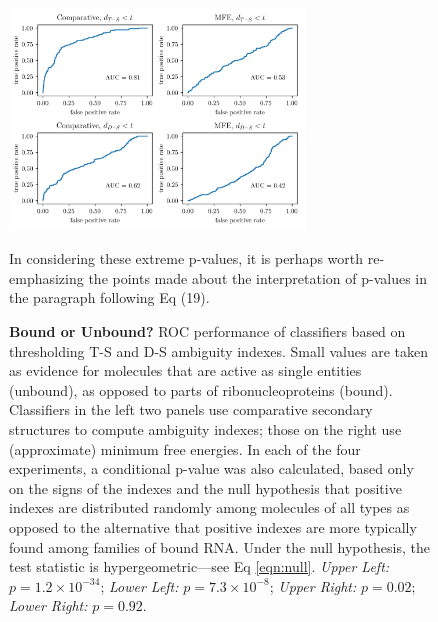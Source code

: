 \begin{figure}[h!]
\centering
\includegraphics[width=0.7\textwidth]{bound_unbound.png}
\vglue 0.5cm

\caption{{\bf Bound or Unbound?} ROC performance of classifiers based on thresholding T-S
and D-S ambiguity indexes. Small values are taken as evidence for molecules that are active as
single entities (unbound), as opposed to parts of ribonucleoproteins (bound). Classifiers in the
left two panels use comparative secondary structures to compute ambiguity indexes; those on the
right use (approximate) minimum free energies. In each of the four experiments, a conditional
p-value was also calculated, based only on the signs of the indexes and the null hypothesis that
positive indexes are distributed randomly among molecules of all types as opposed to the alternative
that positive indexes are more typically found among families of bound RNA. Under the null hypothesis,
the test statistic is hypergeometric---see Eq \ref{eqn:null}. {\em Upper Left:} $p= 1.2 \times 10^{-34} $;
{\em Lower Left:} $p=7.3 \times 10^{-8}$; {\em Upper Right:} $p=0.02$;  {\em Lower Right:} $p=0.92$.}
In considering these extreme p-values, it is perhaps worth re-emphasizing the points made about the interpretation of p-values in the paragraph following Eq (19).
\label{fig:UnboundVSBound}
\end{figure}
